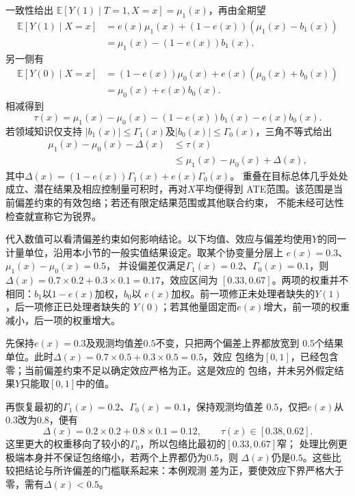 一致性给出
\(\mathbb E[Y(1)\mid T=1,X=x]=\mu_1(x)\)，再由全期望
\[
  \begin{aligned}
    \mathbb E[Y(1)\mid X=x]
    &=e(x)\mu_1(x)+(1-e(x))(\mu_1(x)-b_1(x))\\
    &=\mu_1(x)-(1-e(x))b_1(x).
  \end{aligned}
\]
另一侧有
\[
  \begin{aligned}
    \mathbb E[Y(0)\mid X=x]
    &=(1-e(x))\mu_0(x)+e(x)(\mu_0(x)+b_0(x))\\
    &=\mu_0(x)+e(x)b_0(x).
  \end{aligned}
\]
相减得到
\begin{equation}
  \tau(x)=\mu_1(x)-\mu_0(x)
  -(1-e(x))b_1(x)-e(x)b_0(x).
  \label{eq:causal-selection-bias-function}
\end{equation}
若领域知识仅支持
\(|b_1(x)|\leq\Gamma_1(x)\)及\(|b_0(x)|\leq\Gamma_0(x)\)，三角不等式给出
\begin{equation}
  \begin{aligned}
    \mu_1(x)-\mu_0(x)-\Delta(x)
    &\leq\tau(x)\\
    &\leq\mu_1(x)-\mu_0(x)+\Delta(x),
  \end{aligned}
  \label{eq:causal-sensitivity-bounds}
\end{equation}
其中\(\Delta(x)=(1-e(x))\Gamma_1(x)+e(x)\Gamma_0(x)\)。
重叠在目标总体几乎处处成立、潜在结果及相应控制量可积时，再对\(X\)平均便得到
ATE范围。该范围是当前偏差约束的有效包络；若还有限定结果范围或其他联合约束，
不能未经可达性检查就宣称它为锐界。

代入数值可以看清偏差约束如何影响结论。以下均值、效应与偏差均使用\(Y\)的同一
计量单位，沿用本小节的一般实值结果设定。取某个协变量分层上
\(e(x)=0.3\)、\(\mu_1(x)-\mu_0(x)=0.5\)，
并设偏差仅满足\(\Gamma_1(x)=0.2\)、\(\Gamma_0(x)=0.1\)，则
\(\Delta(x)=0.7\times0.2+0.3\times0.1=0.17\)，效应区间为
\([0.33,0.67]\)。两项的权重并不相同：\(b_1\)以\(1-e(x)\)加权，\(b_0\)以
\(e(x)\)加权。前一项修正未处理者缺失的\(Y(1)\)，后一项修正已处理者缺失的
\(Y(0)\)；若其他量固定而\(e(x)\)增大，前一项的权重减小，后一项的权重增大。

先保持\(e(x)=0.3\)及观测均值差\(0.5\)不变，只把两个偏差上界都放宽到
\(0.5\)个结果单位。此时\(\Delta(x)=0.7\times0.5+0.3\times0.5=0.5\)，效应
包络为\([0,1]\)，已经包含零；当前偏差约束不足以确定效应严格为正。这是效应的
包络，并未另外假定结果\(Y\)只能取\([0,1]\)中的值。

再恢复最初的\(\Gamma_1(x)=0.2\)、\(\Gamma_0(x)=0.1\)，保持观测均值差
\(0.5\)，仅把\(e(x)\)从\(0.3\)改为\(0.8\)，便有
\[
  \Delta(x)=0.2\times0.2+0.8\times0.1=0.12,
  \qquad \tau(x)\in[0.38,0.62].
\]
这里更大的权重移向了较小的\(\Gamma_0\)，所以包络比最初的\([0.33,0.67]\)窄；
处理比例更极端本身并不保证包络缩小，若两个上界都仍为\(0.5\)，则
\(\Delta(x)\)仍是\(0.5\)。这些比较把结论与所许偏差的门槛联系起来：本例观测
差为正，要使效应下界严格大于零，需有\(\Delta(x)<0.5\)。

